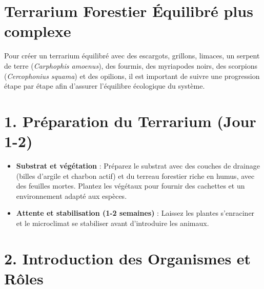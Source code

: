 \newpage

\section*{Terrarium Forestier Équilibré plus complexe}

Pour créer un terrarium équilibré avec des escargots, grillons, limaces, un serpent de terre (\textit{Carphophis amoenus}), des fourmis, des myriapodes noirs, des scorpions (\textit{Cercophonius squama}) et des opilions, il est important de suivre une progression étape par étape afin d'assurer l'équilibre écologique du système.

\section*{1. Préparation du Terrarium (Jour 1-2)}
\begin{itemize}
    \item \textbf{Substrat et végétation} : Préparez le substrat avec des couches de drainage (billes d'argile et charbon actif) et du terreau forestier riche en humus, avec des feuilles mortes. Plantez les végétaux pour fournir des cachettes et un environnement adapté aux espèces.
    \item \textbf{Attente et stabilisation (1-2 semaines)} : Laissez les plantes s'enraciner et le microclimat se stabiliser avant d'introduire les animaux.
\end{itemize}

\section*{2. Introduction des Organismes et Rôles}

